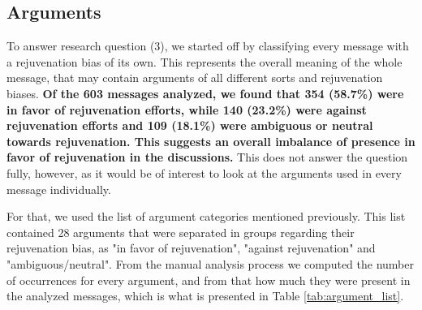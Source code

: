 \subsection{Arguments}

To answer research question (3), we started off by classifying every message with a rejuvenation bias of its own. This represents the overall meaning of the whole message, that may contain arguments of all different sorts and rejuvenation biases. \textbf{Of the 603 messages analyzed, we found that 354 (58.7\%) were in favor of rejuvenation efforts, while 140 (23.2\%) were against rejuvenation efforts and 109 (18.1\%) were ambiguous or neutral towards rejuvenation. This suggests an overall imbalance of presence in favor of rejuvenation in the discussions.} This does not answer the question fully, however, as it would be of interest to look at the arguments used in every message individually.

For that, we used the list of argument categories mentioned previously. This list contained 28 arguments that were separated in groups regarding their rejuvenation bias, as "in favor of rejuvenation", "against rejuvenation" and "ambiguous/neutral". From the manual analysis process we computed the number of occurrences for every argument, and from that how much they were present in the analyzed messages, which is what is presented in Table \ref{tab:argument_list}.

